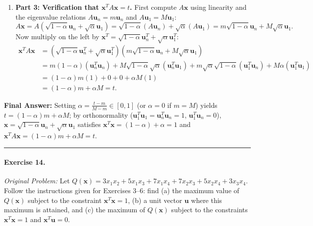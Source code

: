 \documentclass[11pt, letterpaper]{article}
\theoremstyle{definition}
\theoremstyle{remark}
\begin{document}
\begin{enumerate}[leftmargin=2em]
    \item \textbf{Part 3: Verification that $\mathbf{x}^T A \mathbf{x} = t$.}
    First compute $A\mathbf{x}$ using linearity and the eigenvalue relations $A\mathbf{u}_n = m\mathbf{u}_n$ and $A\mathbf{u}_1 = M\mathbf{u}_1$:
    \[
    A\mathbf{x} = A\left(\sqrt{1 - \alpha}\mathbf{u}_n + \sqrt{\alpha}\mathbf{u}_1\right) = \sqrt{1 - \alpha}(A\mathbf{u}_n) + \sqrt{\alpha}(A\mathbf{u}_1) = m\sqrt{1 - \alpha}\mathbf{u}_n + M\sqrt{\alpha}\mathbf{u}_1.
    \]
    Now multiply on the left by $\mathbf{x}^T = \sqrt{1 - \alpha}\mathbf{u}_n^T + \sqrt{\alpha}\mathbf{u}_1^T$:
    \begin{align*}
    \mathbf{x}^T A \mathbf{x} &= \left(\sqrt{1 - \alpha}\mathbf{u}_n^T + \sqrt{\alpha}\mathbf{u}_1^T\right)\left(m\sqrt{1 - \alpha}\mathbf{u}_n + M\sqrt{\alpha}\mathbf{u}_1\right) \\
    &= m(1 - \alpha)(\mathbf{u}_n^T \mathbf{u}_n) + M\sqrt{1 - \alpha}\sqrt{\alpha}(\mathbf{u}_n^T \mathbf{u}_1) + m\sqrt{\alpha}\sqrt{1 - \alpha}(\mathbf{u}_1^T \mathbf{u}_n) + M\alpha(\mathbf{u}_1^T \mathbf{u}_1) \\
    &= (1 - \alpha)m(1) + 0 + 0 + \alpha M(1) \\
    &= (1 - \alpha)m + \alpha M = t.
    \end{align*}
\end{enumerate}
\textbf{Final Answer:} Setting $\alpha = \frac{t - m}{M - m} \in [0, 1]$ (or $\alpha = 0$ if $m = M$) yields $t = (1 - \alpha)m + \alpha M$; by orthonormality ($\mathbf{u}_1^T \mathbf{u}_1 = \mathbf{u}_n^T \mathbf{u}_n = 1$, $\mathbf{u}_1^T \mathbf{u}_n = 0$), $\mathbf{x} = \sqrt{1 - \alpha}\mathbf{u}_n + \sqrt{\alpha}\mathbf{u}_1$ satisfies $\mathbf{x}^T \mathbf{x} = (1 - \alpha) + \alpha = 1$ and $\mathbf{x}^T A \mathbf{x} = (1 - \alpha)m + \alpha M = t$.

\medskip
\hrule
\medskip

\paragraph{Exercise 14.}
\emph{Original Problem:} Let $Q(\mathbf{x}) = 3x_1 x_2 + 5x_1 x_3 + 7x_1 x_4 + 7x_2 x_3 + 5x_2 x_4 + 3x_3 x_4$. Follow the instructions given for Exercises 3--6: find (a) the maximum value of $Q(\mathbf{x})$ subject to the constraint $\mathbf{x}^T \mathbf{x} = 1$, (b) a unit vector $\mathbf{u}$ where this maximum is attained, and (c) the maximum of $Q(\mathbf{x})$ subject to the constraints $\mathbf{x}^T \mathbf{x} = 1$ and $\mathbf{x}^T \mathbf{u} = 0$.
\end{document}
